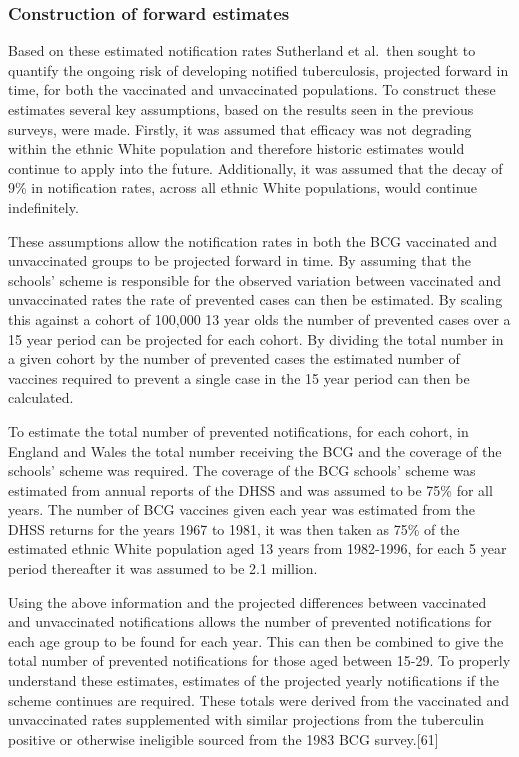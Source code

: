 \documentclass[11pt,twoside]{bristolthesis}
\begin{document}
  \hypertarget{construction-of-forward-estimates}{%
  \subsubsection{Construction of forward estimates}\label{construction-of-forward-estimates}}
  
  Based on these estimated notification rates Sutherland et al.~then sought to quantify the ongoing risk of developing notified tuberculosis, projected forward in time, for both the vaccinated and unvaccinated populations. To construct these estimates several key assumptions, based on the results seen in the previous surveys, were made. Firstly, it was assumed that efficacy was not degrading within the ethnic White population and therefore historic estimates would continue to apply into the future. Additionally, it was assumed that the decay of 9\% in notification rates, across all ethnic White populations, would continue indefinitely.
  
  These assumptions allow the notification rates in both the BCG vaccinated and unvaccinated groups to be projected forward in time. By assuming that the schools' scheme is responsible for the observed variation between vaccinated and unvaccinated rates the rate of prevented cases can then be estimated. By scaling this against a cohort of 100,000 13 year olds the number of prevented cases over a 15 year period can be projected for each cohort. By dividing the total number in a given cohort by the number of prevented cases the estimated number of vaccines required to prevent a single case in the 15 year period can then be calculated.
  
  To estimate the total number of prevented notifications, for each cohort, in England and Wales the total number receiving the BCG and the coverage of the schools' scheme was required. The coverage of the BCG schools' scheme was estimated from annual reports of the DHSS and was assumed to be 75\% for all years. The number of BCG vaccines given each year was estimated from the DHSS returns for the years 1967 to 1981, it was then taken as 75\% of the estimated ethnic White population aged 13 years from 1982-1996, for each 5 year period thereafter it was assumed to be 2.1 million.
  
  Using the above information and the projected differences between vaccinated and unvaccinated notifications allows the number of prevented notifications for each age group to be found for each year. This can then be combined to give the total number of prevented notifications for those aged between 15-29. To properly understand these estimates, estimates of the projected yearly notifications if the scheme continues are required. These totals were derived from the vaccinated and unvaccinated rates supplemented with similar projections from the tuberculin positive or otherwise ineligible sourced from the 1983 BCG survey.{[}61{]}
  
\end{document}

